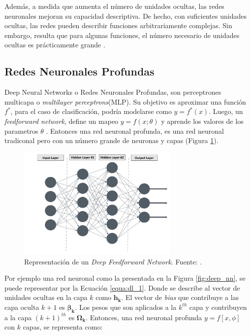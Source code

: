Además, a medida que aumenta el número de unidades ocultas, las redes neuronales  mejoran su capacidad descriptiva. De hecho, con suficientes unidades ocultas, las redes  pueden describir funciones arbitrariamente complejas. Sin embargo, resulta que para algunas funciones, el número necesario de unidades ocultas es prácticamente grande \cite{prince2023understanding}. 




\subsection{Redes Neuronales Profundas}

Deep Neural Networks o Redes Neuronales Profundas,  son perceptrones multicapa o \textit{multilayer perceptrons}(MLP). Su objetivo es aproximar una función $f^*$, para el caso de clasificación, podría modelarse como $ y=f^*(x)$. Luego, un \textit{feedforward network}, define un mapeo $y = f(x;\theta)$ y aprende los valores de los parametros $\theta$ \cite{Goodfellow2016}. Entonces una red neuronal profunda, es una red neuronal tradiconal pero con un número grande de neuronas y capas (Figura \ref{fig:dnn}). 

\begin{figure}[]
	\centering
	\includegraphics[width=0.7\textwidth]{../img/neoantigen/deep_nn}
	\caption{Representación de un \textit{Deep Feedforward Network}. Fuente: \cite{el2022machine}.}
	\label{fig:dnn}
\end{figure}


Por ejemplo una red neuronal como la presentada en la Figura \ref{fig:deep_nn}, se puede representar por la Ecuación \ref{equa:dl_1}. Donde se describe al vector de unidades ocultas en la capa $k$ como $\mathbf{h_k}$. El vector de \textit{bias} que contribuye a las capa oculta $k+1$ es $\mathbf{\beta_k}$. Los pesos que son aplicados a la $k^{th}$ capa y contribuyen a la capa $(k+1)^{th}$ es $\mathbf{\Omega_k}$. Entonces, una red neuronal profunda $y = f[x, \phi]$ con $k$ capas, se representa como:

